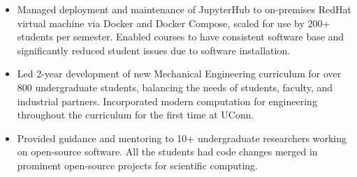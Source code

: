 \begin{itemize}
\item Managed deployment and maintenance of JupyterHub to on-premises RedHat virtual machine via Docker and Docker Compose, scaled for use by 200+ students per semester. Enabled courses to have consistent software base and significantly reduced student issues due to software installation.
\item Led 2-year development of new Mechanical Engineering curriculum for over 800 undergraduate students, balancing the needs of students, faculty, and industrial partners. Incorporated modern computation for engineering throughout the curriculum for the first time at UConn.
\item Provided guidance and mentoring to 10+ undergraduate researchers working on open-source software. All the students had code changes merged in prominent open-source projects for scientific computing.
\end{itemize}
\sectionsep



